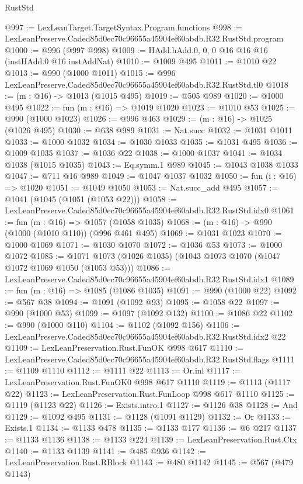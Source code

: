 \begin{lexlean}{RustStd}
\begin{coremodule}
@997 := LexLeanTarget.TargetSyntax.Program.functions
@998 := LexLeanPreserve.Caded85d0ec70c96655a45904ef60abdb.R32.RustStd.program
@1000 := @996 (@997 @998)
@1009 := HAdd.hAdd.{0, 0, 0} @16 @16 @16 (instHAdd.{0} @16 instAddNat)
@1010 := @1009 @495
@1011 := @1010 @22
@1013 := @990 (@1000 @1011)
@1015 := @996 LexLeanPreserve.Caded85d0ec70c96655a45904ef60abdb.R32.RustStd.tl0
@1018 := (m : @16) -> @1013 (@1015 @495)
@1019 := @505 @989
@1020 := @1000 @495
@1022 := fun (m : @16) => @1019 @1020
@1023 := @1010 @53
@1025 := @990 (@1000 @1023)
@1026 := @996 @463
@1029 := (m : @16) -> @1025 (@1026 @495)
@1030 := @638 @989
@1031 := Nat.succ
@1032 := @1031 @1011
@1033 := @1000 @1032
@1034 := @1030 @1033
@1035 := @1031 @495
@1036 := @1009 @1035
@1037 := @1036 @22
@1038 := @1000 @1037
@1041 := @1034 @1038 (@1015 @1035)
@1043 := Eq.symm.{1} @989
@1045 := @1043 @1038 @1033
@1047 := @711 @16 @989
@1049 := @1047 @1037 @1032
@1050 := fun (i : @16) => @1020
@1051 := @1049 @1050
@1053 := Nat.succ_add @495
@1057 := @1041 (@1045 (@1051 (@1053 @22)))
@1058 := LexLeanPreserve.Caded85d0ec70c96655a45904ef60abdb.R32.RustStd.idx0
@1061 := fun (m : @16) => @1057 (@1058 @1035)
@1068 := (m : @16) -> @990 (@1000 (@1010 @110)) (@996 @461 @495)
@1069 := @1031 @1023
@1070 := @1000 @1069
@1071 := @1030 @1070
@1072 := @1036 @53
@1073 := @1000 @1072
@1085 := @1071 @1073 (@1026 @1035) (@1043 @1073 @1070 (@1047 @1072 @1069 @1050 (@1053 @53)))
@1086 := LexLeanPreserve.Caded85d0ec70c96655a45904ef60abdb.R32.RustStd.idx1
@1089 := fun (m : @16) => @1085 (@1086 @1035)
@1091 := @990 (@1000 @22)
@1092 := @567 @38
@1094 := @1091 (@1092 @93)
@1095 := @1058 @22
@1097 := @990 (@1000 @53)
@1099 := @1097 (@1092 @132)
@1100 := @1086 @22
@1102 := @990 (@1000 @110)
@1104 := @1102 (@1092 @156)
@1106 := LexLeanPreserve.Caded85d0ec70c96655a45904ef60abdb.R32.RustStd.idx2 @22
@1109 := LexLeanPreservation.Rust.FunOK @998 @617
@1110 := LexLeanPreserve.Caded85d0ec70c96655a45904ef60abdb.R32.RustStd.flags
@1111 := @1109 @1110
@1112 := @1111 @22
@1113 := Or.inl
@1117 := LexLeanPreservation.Rust.FunOK0 @998 @617 @1110
@1119 := @1113 (@1117 @22)
@1123 := LexLeanPreservation.Rust.FunLoop @998 @617 @1110
@1125 := @1119 (@1123 @22)
@1126 := Exists.intro.{1}
@1127 := @1126 @38
@1128 := And
@1129 := @1092 @495
@1131 := @1128 (@1091 @1129)
@1132 := Or
@1133 := Exists.{1}
@1134 := @1133 @478
@1135 := @1133 @177
@1136 := @6 @217
@1137 := @1133 @1136
@1138 := @1133 @224
@1139 := LexLeanPreservation.Rust.Ctx
@1140 := @1133 @1139
@1141 := @485 @936
@1142 := LexLeanPreservation.Rust.RBlock
@1143 := @480 @1142
@1145 := @567 (@479 @1143)

\end{coremodule}
\end{lexlean}
